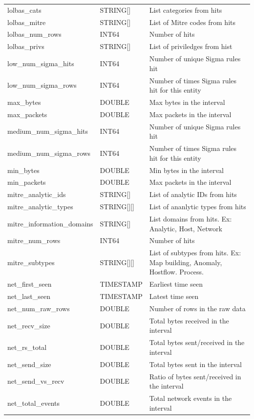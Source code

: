\documentclass[conference,compsoc]{IEEEtran}
\begin{document}
\begin{longtable}{|p{5cm}|p{2cm}|p{9cm}|}
lolbas\_cats & STRING[] & List categories from hits \\
lolbas\_mitre & STRING[] & List of Mitre codes from hits \\
lolbas\_num\_rows & INT64 & Number of hits \\
lolbas\_privs & STRING[] & List of priviledges from hist \\
low\_num\_sigma\_hits & INT64 & Number of unique Sigma rules hit \\
low\_num\_sigma\_rows & INT64 & Number of times Sigma rules hit for this entity \\
max\_bytes & DOUBLE & Max bytes in the interval \\
max\_packets & DOUBLE & Max packets in the interval \\
medium\_num\_sigma\_hits & INT64 & Number of unique Sigma rules hit \\
medium\_num\_sigma\_rows & INT64 & Number of times Sigma rules hit for this entity \\
min\_bytes & DOUBLE & Min bytes in the interval \\
min\_packets & DOUBLE & Max packets in the interval \\
mitre\_analytic\_ids & STRING[] & List of analytic IDs from hits \\
mitre\_analytic\_types & STRING[][] & List of ananlytic types from hits \\
mitre\_information\_domains & STRING[] & List domains from hits. Ex: Analytic, Host, Network \\
mitre\_num\_rows & INT64 & Number of hits \\
mitre\_subtypes & STRING[][] & List of subtypes from hits. Ex: Map building, Anomaly, Hostflow.  Process. \\
net\_first\_seen & TIMESTAMP & Earliest time seen \\
net\_last\_seen & TIMESTAMP & Latest time seen \\
net\_num\_raw\_rows & DOUBLE & Number of rows in the raw data \\
net\_recv\_size & DOUBLE & Total bytes received in the interval \\
net\_rs\_total & DOUBLE & Total bytes sent/received in the interval \\
net\_send\_size & DOUBLE & Total bytes sent in the interval \\
net\_send\_vs\_recv & DOUBLE & Ratio of bytes sent/received in the interval \\
net\_total\_events & DOUBLE & Total network events in the interval \\

\end{longtable}
\end{document}
